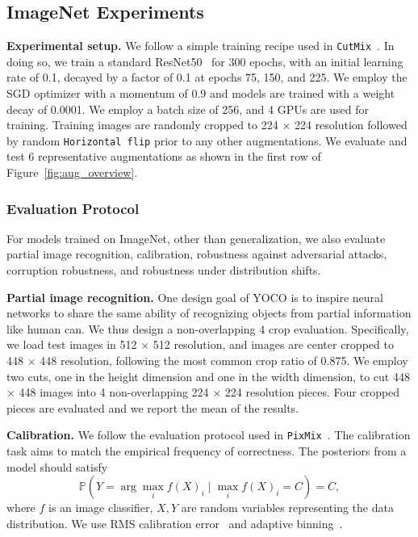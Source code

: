 \documentclass{article}
\begin{document}
\subsection{ImageNet Experiments}
\textbf{Experimental setup.} 
We follow a simple training recipe used in \texttt{CutMix}~\cite{yun2019CutMix}. In doing so, we train a standard ResNet50~\cite{resnet} for 300 epochs, with an initial learning rate of 0.1, decayed by a factor of 0.1 at epochs 75, 150, and 225. We employ the SGD optimizer with a momentum of 0.9 and models are trained with a weight decay of 0.0001. We employ a batch size of 256, and 4 GPUs are used for training. Training images are randomly cropped to 224 $\times$ 224 resolution followed by random \texttt{Horizontal flip} prior to any other augmentations. We evaluate and test 6 representative augmentations as shown in the first row of Figure~\ref{fig:aug_overview}.

\subsubsection{Evaluation Protocol}
For models trained on ImageNet, other than generalization, we also evaluate partial image recognition, calibration, robustness against adversarial attacks, corruption robustness, and robustness under distribution shifts.

\textbf{Partial image recognition.} 
One design goal of YOCO is to inspire neural networks to share the same ability of recognizing objects from partial information like human can. We thus design a non-overlapping 4 crop evaluation. Specifically, we load test images in 512 $\times$ 512 resolution, and images are center cropped to 448 $\times$ 448 resolution, following the most common crop ratio of 0.875. We employ two cuts, one in the height dimension and one in the width dimension, to cut 448 $\times$ 448 images into 4 non-overlapping 224 $\times$ 224 resolution pieces. Four cropped pieces are evaluated and we report the mean of the results. 

\textbf{Calibration.} We follow the evaluation protocol used in \texttt{PixMix}~\cite{hendrycks2021pixmix}. The calibration task aims to match the empirical frequency of correctness. The posteriors from a model should satisfy $$
\mathbb{P}\left(Y=\arg \max _{i} f(X)_{i} \mid \max _{i} f(X)_{i}=C\right)=C,
$$ where $f$ is an image classifier, $X, Y$ are random variables representing the data distribution. We use RMS calibration error~\cite{hendrycks2018deep} and adaptive binning~\cite{nguyen2015posterior}.
\end{document}
